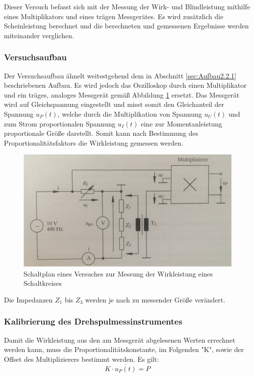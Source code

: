Dieser Versuch befasst sich mit der Messung der Wirk- und Blindleistung mithilfe eines Multiplikators und eines trägen Messgerätes. Es wird zusätzlich die Scheinleistung berechnet und die berechneten und gemessenen Ergebnisse werden miteinander verglichen.

\subsubsection{Versuchsaufbau}

Der Versuchsaufbau ähnelt weitestgehend dem in Abschnitt \ref{sec:Aufbau2.2.1} beschriebenen Aufbau. Es wird jedoch das Oszilloskop durch einen Multiplikator und ein träges, analoges Messgerät gemäß Abbildung \ref{fig:Plan2-2} ersetzt. Das Messgerät wird auf Gleichspannung eingestellt und misst somit den Gleichanteil der Spannung $u_P(t)$, welche durch die Multiplikation von Spannung $u_U(t)$ und zum Strom proportionalen Spannung $u_I(t)$ eine zur Momentanleistung proportionale Größe darstellt. Somit kann nach Bestimmung des Proportionalitätsfaktors die Wirkleistung gemessen werden.

\begin{figure}[H]
\centering
\includegraphics[width=0.7\linewidth]{Images/Aufbau2-2.png}
\caption{Schaltplan eines Versuches zur Messung der Wirkleistung eines Schaltkreises \cite[49]{GEMLBuch}}
\label{fig:Plan2-2}
\end{figure}
Die Impedanzen $Z_1$ bis $Z_3$ werden je nach zu messender Größe verändert.

\subsubsection{Kalibrierung des Drehspulmessinstrumentes}
Damit die Wirkleistung aus den am Messgerät abgelesenen Werten errechnet werden kann, muss die Proportionalitätskonstante, im Folgenden "K", sowie der Offset des Multiplizierers bestimmt werden.
Es gilt:
\begin{equation}
K\cdot \overline{u_P(t)} = P
\label{eq:PropFaktor}
\end{equation}


